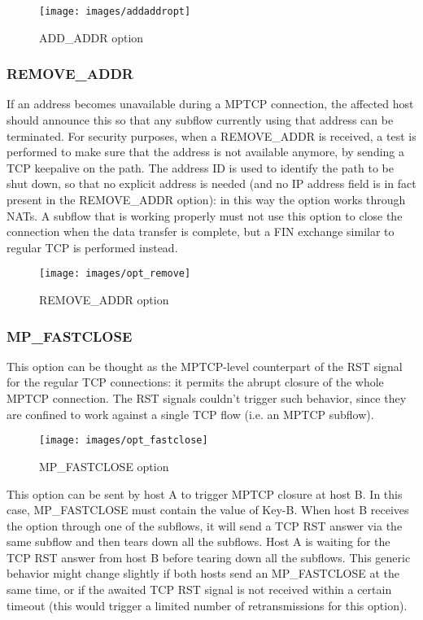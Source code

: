 \begin{figure}[!htb]
\centering
\texttt{[image: images/addaddropt]}
\caption{ADD\_ADDR option}
\label{fig:addaddropt}
\end{figure}

\subsubsection{REMOVE\_ADDR}
If an address becomes unavailable during a MPTCP connection, the affected host should announce this so that any subflow currently using that address can be terminated. For security purposes, when a REMOVE\_ADDR is received, a test is performed to make sure that the address is not available anymore, by sending a TCP keepalive on the path.
The address ID is used to identify the path to be shut down, so that no explicit address is needed (and no IP address field is in fact present in the REMOVE\_ADDR option): in this way the option works through NATs. 
A subflow that is working properly must not use this option to close the connection when the data transfer is complete, but a FIN exchange similar to regular TCP is performed instead.

\begin{figure}[!htb]
\centering
\texttt{[image: images/opt\_remove]}
\caption{REMOVE\_ADDR option}
\label{fig:opt_remove}
\end{figure}

\subsubsection{MP\_FASTCLOSE}
This option can be thought as the MPTCP-level counterpart of the RST signal for the regular TCP connections: it permits the abrupt closure of the whole MPTCP connection. The RST signals couldn't trigger such behavior, since they are confined to work against a single TCP flow (i.e. an MPTCP subflow).

\begin{figure}[!htb]
\centering
\texttt{[image: images/opt\_fastclose]}
\caption{MP\_FASTCLOSE option}
\label{fig:opt_fastclose}
\end{figure}

This option can be sent by host A to trigger MPTCP closure at host B. In this case, MP\_FASTCLOSE must contain the value of Key-B. When host B receives the option through one of the subflows, it will send a TCP RST answer via the same subflow and then tears down all the subflows. Host A is waiting for the TCP RST answer from host B before tearing down all the subflows. This generic behavior might change slightly if both hosts send an MP\_FASTCLOSE at the same time, or if the awaited TCP RST signal is not received within a certain timeout (this would trigger a limited number of retransmissions for this option).


